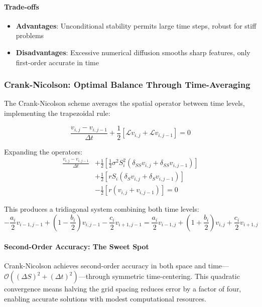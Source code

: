 \documentclass[11pt,a4paper]{article}
\begin{document}
\paragraph{Trade-offs}
\begin{itemize}
\item \textbf{Advantages}: Unconditional stability permits large time steps, robust for stiff problems
\item \textbf{Disadvantages}: Excessive numerical diffusion smooths sharp features, only first-order accurate in time
\end{itemize}

\subsubsection{Crank-Nicolson: Optimal Balance Through Time-Averaging}

The Crank-Nicolson scheme averages the spatial operator between time levels, implementing the trapezoidal rule:

\begin{equation}
\frac{v_{i,j} - v_{i,j-1}}{\Delta t} + \frac{1}{2}\left[\mathcal{L}v_{i,j} + \mathcal{L}v_{i,j-1}\right] = 0
\end{equation}

Expanding the operators:
\begin{align}
\frac{v_{i,j} - v_{i,j-1}}{\Delta t} &+ \frac{1}{2}\left[\frac{1}{2}\sigma^2 S_i^2(\delta_{SS}v_{i,j} + \delta_{SS}v_{i,j-1})\right] \\
&+ \frac{1}{2}\left[rS_i(\delta_S v_{i,j} + \delta_S v_{i,j-1})\right] \\
&- \frac{1}{2}\left[r(v_{i,j} + v_{i,j-1})\right] = 0
\end{align}

This produces a tridiagonal system combining both time levels:
\begin{equation}
-\frac{a_i}{2}v_{i-1,j-1} + (1 - \frac{b_i}{2})v_{i,j-1} - \frac{c_i}{2}v_{i+1,j-1} = \frac{a_i}{2}v_{i-1,j} + (1 + \frac{b_i}{2})v_{i,j} + \frac{c_i}{2}v_{i+1,j}
\end{equation}

\paragraph{Second-Order Accuracy: The Sweet Spot}

Crank-Nicolson achieves second-order accuracy in both space and time—$\mathcal{O}((\Delta S)^2 + (\Delta t)^2)$—through symmetric time-centering. This quadratic convergence means halving the grid spacing reduces error by a factor of four, enabling accurate solutions with modest computational resources.
\end{document}
